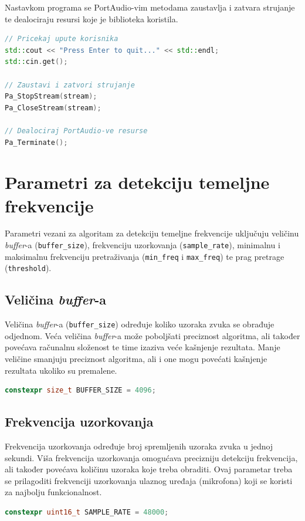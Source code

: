 \documentclass[times, utf8, diplomski, numeric]{fer}
\begin{document}
Nastavkom programa se PortAudio-vim metodama zaustavlja i zatvara strujanje te dealociraju resursi koje je biblioteka koristila.

\begin{lstlisting}[language=C++, frame=single]
// Pricekaj upute korisnika
std::cout << "Press Enter to quit..." << std::endl;
std::cin.get();
	
// Zaustavi i zatvori strujanje
Pa_StopStream(stream);
Pa_CloseStream(stream);
	
// Dealociraj PortAudio-ve resurse
Pa_Terminate();
\end{lstlisting}

\section{Parametri za detekciju temeljne frekvencije}
%
Parametri vezani za algoritam za detekciju temeljne frekvencije uključuju veličinu \textit{buffer}-a (\lstinline[basicstyle=\ttfamily]|buffer_size|), frekvenciju uzorkovanja (\lstinline[basicstyle=\ttfamily]|sample_rate|), minimalnu i maksimalnu frekvenciju pretraživanja (\lstinline[basicstyle=\ttfamily]|min_freq| i \lstinline[basicstyle=\ttfamily]|max_freq|) te prag pretrage (\lstinline[basicstyle=\ttfamily]|threshold|).

\subsection{Veličina \textit{buffer}-a}
%
Veličina \textit{buffer}-a (\lstinline[basicstyle=\ttfamily]|buffer_size|) određuje koliko uzoraka zvuka se obrađuje odjednom. Veća veličina \textit{buffer}-a može poboljšati preciznost algoritma, ali također povećava računalnu složenost te time izaziva veće kašnjenje rezultata. Manje veličine smanjuju preciznost algoritma, ali i one mogu povećati kašnjenje rezultata ukoliko su premalene.
\begin{lstlisting}[language=C++, frame=single]
constexpr size_t BUFFER_SIZE = 4096;
\end{lstlisting}

\subsection{Frekvencija uzorkovanja}
%
Frekvencija uzorkovanja određuje broj spremljenih uzoraka zvuka u jednoj sekundi. Viša frekvencija uzorkovanja omogućava precizniju detekciju frekvencija, ali također povećava količinu uzoraka koje treba obraditi. Ovaj parametar treba se prilagoditi frekvenciji uzorkovanja ulaznog uređaja (mikrofona) koji se koristi za najbolju funkcionalnost.
\begin{lstlisting}[language=C++, frame=single]
constexpr uint16_t SAMPLE_RATE = 48000;
\end{lstlisting}
\end{document}
